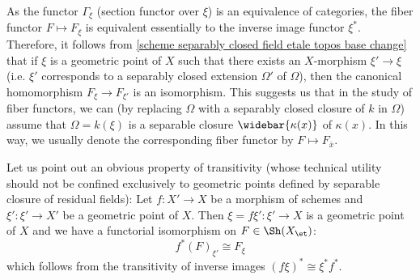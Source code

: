 As the functor $\Gamma_\xi$ (section functor over $\xi$) is an equivalence of categories, the fiber functor $F\mapsto F_\xi$ is equivalent essentially to the inverse image functor $\xi^*$. Therefore, it follows from \cref{scheme separably closed field etale topos base change} that if $\xi$ is a geometric point of $X$ such that there exists an $X$-morphism $\xi'\to\xi$ (i.e. $\xi'$ corresponds to a separably closed extension $\Omega'$ of $\Omega$), then the canonical homomorphism $F_\xi\to F_{\xi'}$ is an isomorphism. This suggests us that in the study of fiber functors, we can (by replacing $\Omega$ with a separably closed closure of $k$ in $\Omega$) assume that $\Omega=k(\xi)$ is a separable closure $\widebar{\kappa(x)}$ of $\kappa(x)$. In this way, we usually denote the corresponding fiber functor by $F\mapsto F_{\bar{x}}$.\par
Let us point out an obvious property of transitivity (whose technical utility should not be confined exclusively to geometric points defined by separable closure of residual fields): Let $f:X'\to X$ be a morphism of schemes and $\xi':\xi'\to X'$ be a geometric point of $X$. Then $\xi=f\xi':\xi'\to X$ is a geometric point of $X$ and we have a functorial isomorphism on $F\in\Sh(X_\et)$:
\begin{equation}\label{scheme fiber functor transitivity}
f^*(F)_{\xi'}\cong F_\xi
\end{equation}
which follows from the transitivity of inverse images $(f\xi)^*\cong \xi^*f^*$.\par

